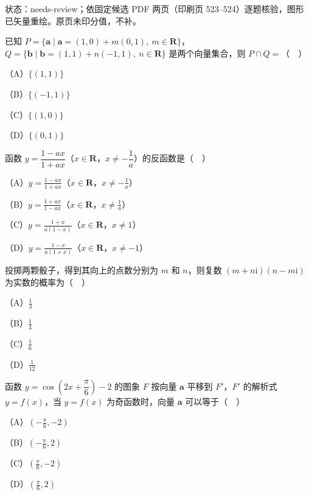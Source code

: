 

状态：needs-review；依固定候选 PDF 两页（印刷页 523–524）逐题核验，图形已矢量重绘。原页未印分值，不补。


\begin{question}
已知 $P=\{\boldsymbol a\mid\boldsymbol a=(1,0)+m(0,1),\ m\in\mathbf R\}$，$Q=\{\boldsymbol b\mid\boldsymbol b=(1,1)+n(-1,1),\ n\in\mathbf R\}$ 是两个向量集合，则 $P\cap Q=$（　）

（A）$\{(1,1)\}$

（B）$\{(-1,1)\}$

（C）$\{(1,0)\}$

（D）$\{(0,1)\}$

\end{question}
\begin{question}
函数 $y=\dfrac{1-ax}{1+ax}$（$x\in\mathbf R$，$x\neq-\dfrac1a$）的反函数是（　）

（A）$y=\frac{1-ax}{1+ax}$（$x\in\mathbf R$，$x\neq-\frac1a$）

（B）$y=\frac{1+ax}{1-ax}$（$x\in\mathbf R$，$x\neq\frac1a$）

（C）$y=\frac{1+x}{a(1-x)}$（$x\in\mathbf R$，$x\neq1$）

（D）$y=\frac{1-x}{a(1+x)}$（$x\in\mathbf R$，$x\neq-1$）

\end{question}
\begin{question}
投掷两颗骰子，得到其向上的点数分别为 $m$ 和 $n$，则复数 $(m+n\mathrm i)(n-m\mathrm i)$ 为实数的概率为（　）

（A）$\frac13$

（B）$\frac14$

（C）$\frac16$

（D）$\frac1{12}$

\end{question}
\begin{question}
函数 $y=\cos\left(2x+\dfrac\pi6\right)-2$ 的图象 $F$ 按向量 $\boldsymbol a$ 平移到 $F'$，$F'$ 的解析式 $y=f(x)$，当 $y=f(x)$ 为奇函数时，向量 $\boldsymbol a$ 可以等于（　）

（A）$\left(-\frac\pi6,-2\right)$

（B）$\left(-\frac\pi6,2\right)$

（C）$\left(\frac\pi6,-2\right)$

（D）$\left(\frac\pi6,2\right)$

\end{question}
